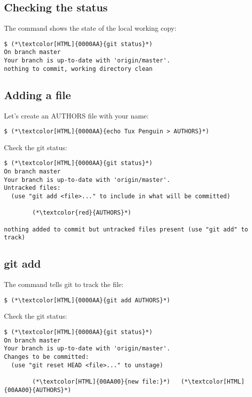 \subsection{Checking the status}
\begin{frame}[fragile]
  \subslidetitle

  The command  shows the state of the local working copy:
  \begin{lstlisting}
$ (*\textcolor[HTML]{0000AA}{git status}*)
On branch master
Your branch is up-to-date with 'origin/master'.
nothing to commit, working directory clean
\end{lstlisting}
\end{frame}


\subsection{Adding a file}
\begin{frame}[fragile]
  \subslidetitle

  Let's create an AUTHORS file with your name:
  \begin{lstlisting}
$ (*\textcolor[HTML]{0000AA}{echo Tux Penguin > AUTHORS}*)
\end{lstlisting}

  Check the git status:
  \begin{lstlisting}
$ (*\textcolor[HTML]{0000AA}{git status}*)
On branch master
Your branch is up-to-date with 'origin/master'.
Untracked files:
  (use "git add <file>..." to include in what will be committed)

        (*\textcolor{red}{AUTHORS}*)

nothing added to commit but untracked files present (use "git add" to track)
\end{lstlisting}

\end{frame}

\subsection{git add}
\begin{frame}[fragile]
  \subslidetitle

  The command  tells git to track the file:
  \begin{lstlisting}
$ (*\textcolor[HTML]{0000AA}{git add AUTHORS}*)
\end{lstlisting}

  Check the git status:
  \begin{lstlisting}
$ (*\textcolor[HTML]{0000AA}{git status}*)
On branch master
Your branch is up-to-date with 'origin/master'.
Changes to be committed:
  (use "git reset HEAD <file>..." to unstage)

        (*\textcolor[HTML]{00AA00}{new file:}*)   (*\textcolor[HTML]{00AA00}{AUTHORS}*)
  \end{lstlisting}
\end{frame}



